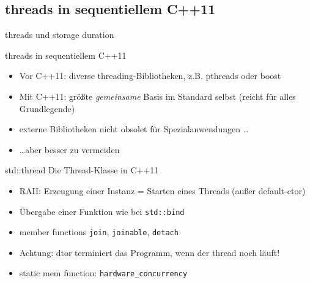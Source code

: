 \subsection{threads in sequentiellem C++11}

\begin{frame}{threads und storage duration}
\end{frame}

\begin{frame}{threads in sequentiellem C++11}
	\begin{itemize}
		\item Vor C++11: diverse threading-Bibliotheken, z.B. pthreads oder boost
		\item Mit C++11: größte \emph{gemeinsame} Basis im Standard selbst (reicht für alles Grundlegende)
		\item externe Bibliotheken nicht obsolet für Spezialanwendungen \dots
		\item \dots aber besser zu vermeiden
	\end{itemize}
	
	\pause
	
	\begin{block}{std::thread}
		Die Thread-Klasse in C++11
		\begin{itemize}
			\item RAII: Erzeugung einer Instanz = Starten eines Threads (außer default-ctor)
			\item Übergabe einer Funktion wie bei \texttt{std::bind}
			\item member functions \texttt{join}, \texttt{joinable}, \texttt{detach}
			\item Achtung: dtor terminiert das Programm, wenn der thread noch läuft!
			\item static mem function: \texttt{hardware\_concurrency}
		\end{itemize}
	\end{block}
\end{frame}

